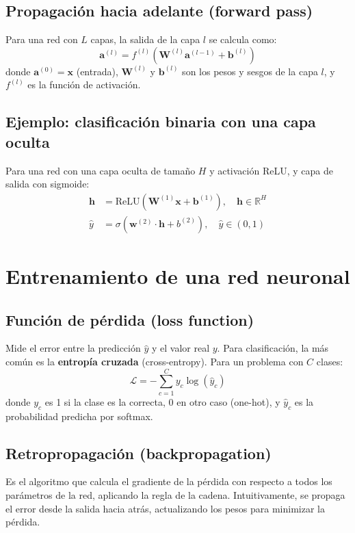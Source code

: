 \documentclass[12pt,a4paper,openany,oneside]{book}
\begin{document}
\subsection{Propagación hacia adelante (forward pass)}
Para una red con \(L\) capas, la salida de la capa \(l\) se calcula como:
\[
\mathbf{a}^{(l)} = f^{(l)}\left( \mathbf{W}^{(l)} \mathbf{a}^{(l-1)} + \mathbf{b}^{(l)} \right)
\]
donde \(\mathbf{a}^{(0)} = \mathbf{x}\) (entrada), \(\mathbf{W}^{(l)}\) y \(\mathbf{b}^{(l)}\) son los pesos y sesgos de la capa \(l\), y \(f^{(l)}\) es la función de activación.

\subsection{Ejemplo: clasificación binaria con una capa oculta}
Para una red con una capa oculta de tamaño \(H\) y activación ReLU, y capa de salida con sigmoide:
\begin{align*}
\mathbf{h} &= \text{ReLU}(\mathbf{W}^{(1)} \mathbf{x} + \mathbf{b}^{(1)}), \quad \mathbf{h} \in \mathbb{R}^H \\
\hat{y} &= \sigma(\mathbf{w}^{(2)} \cdot \mathbf{h} + b^{(2)}), \quad \hat{y} \in (0,1)
\end{align*}

\section{Entrenamiento de una red neuronal}

\subsection{Función de pérdida (loss function)}
Mide el error entre la predicción \(\hat{y}\) y el valor real \(y\). Para clasificación, la más común es la \textbf{entropía cruzada} (cross-entropy). Para un problema con \(C\) clases:
\[
\mathcal{L} = -\sum_{c=1}^{C} y_c \log(\hat{y}_c)
\]
donde \(y_c\) es 1 si la clase es la correcta, 0 en otro caso (one-hot), y \(\hat{y}_c\) es la probabilidad predicha por softmax.

\subsection{Retropropagación (backpropagation)}
Es el algoritmo que calcula el gradiente de la pérdida con respecto a todos los parámetros de la red, aplicando la regla de la cadena. Intuitivamente, se propaga el error desde la salida hacia atrás, actualizando los pesos para minimizar la pérdida.
\end{document}
